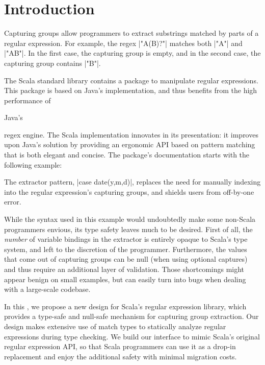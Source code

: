 \def\paper{\thesisOnly{chapter}\paperOnly{paper}\xspace}

\section{Introduction}

Capturing groups allow programmers to extract substrings matched by parts of a regular expression.
For example, the regex |"A(B)?"| matches both |"A"| and |"AB"|.
In the first case, the capturing group is empty, and in the second case, the capturing group contains |"B"|.

The Scala standard library contains a package to manipulate regular expressions.
This package is based on Java's implementation, and thus benefits from the high performance of \begin{diff}Java's\end{diff} regex engine.
The Scala implementation innovates in its presentation: it improves upon Java's solution by providing an ergonomic API based on pattern matching that is both elegant and concise.
The package's documentation starts with the following example:

\regexDocumentation

\noindent
The extractor pattern, |case date(y,m,d)|, replaces the need for manually indexing into the regular expression's capturing groups, and shields users from off-by-one error.

While the syntax used in this example would undoubtedly make some non-Scala programmers envious, its type safety leaves much to be desired.
First of all, the \emph{number} of variable bindings in the extractor is entirely opaque to Scala's type system, and left to the discretion of the programmer.
Furthermore, the values that come out of capturing groups can be null (when using optional captures) and thus require an additional layer of validation.
Those shortcomings might appear benign on small examples, but can easily turn into bugs when dealing with a large-scale codebase.

In this \paper, we propose a new design for Scala's regular expression library, which provides a type-safe and null-safe mechanism for capturing group extraction.
Our design makes extensive use of match types to statically analyze regular expressions during type checking.
We build our interface to mimic Scala's original regular expression API, so that Scala programmers can use it as a drop-in replacement and enjoy the additional safety with minimal migration costs.

